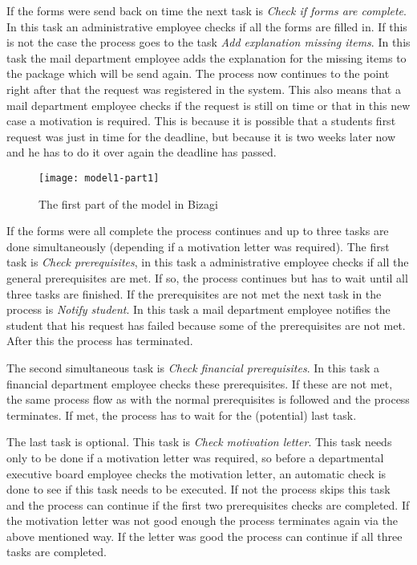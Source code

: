 If the forms were send back on time the next task is \emph{Check if forms are complete}.
In this task an administrative employee checks if all the forms are filled in.
If this is not the case the process goes to the task \emph{Add explanation missing items}.
In this task the mail department employee adds the explanation for the missing items to the package which will be send again.
The process now continues to the point right after that the request was registered in the system.
This also means that a mail department employee checks if the request is still on time or that in this new case a motivation is required.
This is because it is possible that a students first request was just in time for the deadline, but because it is two weeks later now and he has to do it over again the deadline has passed.

\begin{figure}[H]
	\centering
	\texttt{[image: model1-part1]}
	\caption{The first part of the model in Bizagi}
	\label{fig:model1-part1}
\end{figure}

If the forms were all complete the process continues and up to three tasks are done simultaneously (depending if a motivation letter was required).
The first task is \emph{Check prerequisites}, in this task a administrative employee checks if all the general prerequisites are met.
If so, the process continues but has to wait until all three tasks are finished.
If the prerequisites are not met the next task in the process is \emph{Notify student}.
In this task a mail department employee notifies the student that his request has failed because some of the prerequisites are not met.
After this the process has terminated.

The second simultaneous task is \emph{Check financial prerequisites}.
In this task a financial department employee checks these prerequisites.
If these are not met, the same process flow as with the normal prerequisites is followed and the process terminates.
If met, the process has to wait for the (potential) last task.

The last task is optional. This task is \emph{Check motivation letter}.
This task needs only to be done if a motivation letter was required, so before a departmental executive board employee checks the motivation letter,
an automatic check is done to see if this task needs to be executed.
If not the process skips this task and the process can continue if the first two prerequisites checks are completed.
If the motivation letter was not good enough the process terminates again via the above mentioned way.
If the letter was good the process can continue if all three tasks are completed.

